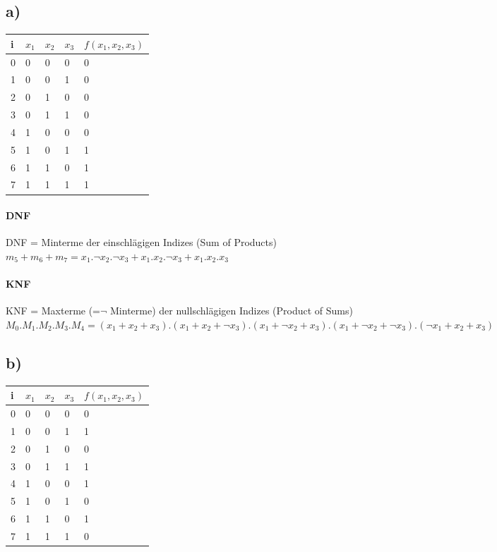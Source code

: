 \documentclass[10pt,a4paper]{scrartcl}
\begin{document}
\subsection{a)}
\begin{tabular}{|l||l|l|l||l|}\hline
i & $x_1$ & $x_2$ & $x_3$ & $f(x_1,x_2,x_3)$ \\\hline\hline
0 & 0 & 0 & 0 & 0 \\\hline
1 & 0 & 0 & 1 & 0 \\\hline
2 & 0 & 1 & 0 & 0 \\\hline
3 & 0 & 1 & 1 & 0 \\\hline
4 & 1 & 0 & 0 & 0 \\\hline
5 & 1 & 0 & 1 & 1 \\\hline
6 & 1 & 1 & 0 & 1 \\\hline
7 & 1 & 1 & 1 & 1 \\\hline
\end{tabular}

\paragraph{DNF}
DNF = Minterme der einschlägigen Indizes (Sum of Products)\\
$m_5 + m_6 + m_7 = x_1.\neg x_2.\neg x_3 + x_1.x_2.\neg x_3 + x_1.x_2.x_3$

\paragraph{KNF}
KNF = Maxterme (=$\neg$ Minterme) der nullschlägigen Indizes (Product of Sums)\\
$M_0 . M_1 . M_2 . M_3 . M_4 = (x_1+x_2+x_3) . (x_1+x_2+\neg x_3) . (x_1+\neg x_2+x_3) . (x_1+\neg x_2+\neg x_3) . (\neg x_1+x_2+x_3)$

\subsection{b)}
\begin{tabular}{|l||l|l|l||l|}\hline
i & $x_1$ & $x_2$ & $x_3$ & $f(x_1,x_2,x_3)$ \\\hline\hline
0 & 0 & 0 & 0 & 0 \\\hline
1 & 0 & 0 & 1 & 1 \\\hline
2 & 0 & 1 & 0 & 0 \\\hline
3 & 0 & 1 & 1 & 1 \\\hline
4 & 1 & 0 & 0 & 1 \\\hline
5 & 1 & 0 & 1 & 0 \\\hline
6 & 1 & 1 & 0 & 1 \\\hline
7 & 1 & 1 & 1 & 0 \\\hline
\end{tabular}
\end{document}

